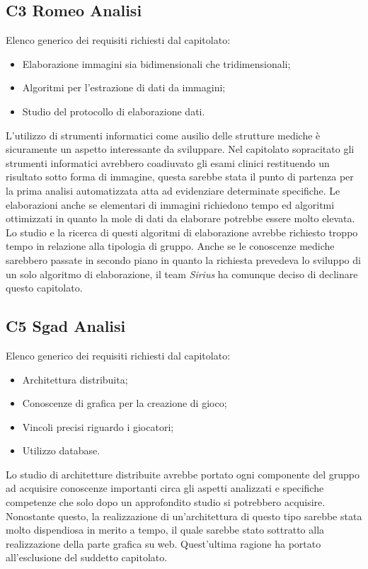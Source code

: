 \subsection{C3 Romeo Analisi}
Elenco generico dei requisiti richiesti dal capitolato:
\begin{itemize} 
\item Elaborazione immagini sia bidimensionali che tridimensionali;
\item Algoritmi per l'estrazione di dati da immagini;
\item Studio del protocollo di elaborazione dati.
\end{itemize}
L'utilizzo di strumenti informatici come ausilio delle strutture mediche è sicuramente un aspetto interessante da sviluppare. Nel capitolato sopracitato gli strumenti informatici avrebbero coadiuvato gli esami clinici restituendo un risultato sotto forma di immagine, questa sarebbe stata il punto di partenza per la prima analisi automatizzata atta ad evidenziare determinate specifiche. Le elaborazioni anche se elementari di immagini richiedono tempo ed algoritmi ottimizzati in quanto la mole di dati da elaborare potrebbe essere molto elevata. Lo studio e la ricerca di questi algoritmi di elaborazione avrebbe richiesto troppo tempo in relazione alla tipologia di gruppo. Anche se le conoscenze mediche sarebbero passate in secondo piano in quanto la richiesta prevedeva lo sviluppo di un solo algoritmo di elaborazione, il team \textit{Sirius} ha comunque deciso di declinare questo capitolato.   \\
\subsection{C5 Sgad Analisi}
Elenco generico dei requisiti richiesti dal capitolato:
\begin{itemize} 
\item Architettura distribuita;
\item Conoscenze di grafica per la creazione di gioco;
\item Vincoli precisi riguardo i giocatori;
\item Utilizzo database.
\end{itemize}
Lo studio di architetture distribuite avrebbe portato ogni componente del gruppo ad acquisire conoscenze importanti circa gli aspetti analizzati e specifiche competenze che solo dopo un approfondito studio si potrebbero acquisire. Nonostante questo, la realizzazione di un'architettura di questo tipo sarebbe stata molto dispendiosa in merito a tempo, il quale sarebbe stato sottratto alla realizzazione della parte grafica su web. Quest'ultima ragione ha portato all'esclusione del suddetto capitolato.\\
